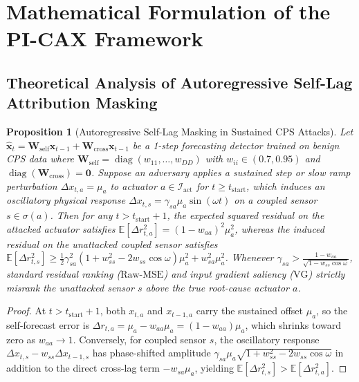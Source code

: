 \documentclass[10pt,a4paper]{article}
\newtheorem{proposition}{Proposition}
\begin{document}
\section{Mathematical Formulation of the PI-CAX Framework}

\subsection{Theoretical Analysis of Autoregressive Self-Lag Attribution Masking}

\begin{proposition}[Autoregressive Self-Lag Masking in Sustained CPS Attacks]\label{prop:masking}
Let $\hat{\mathbf{x}}_t = \mathbf{W}_{\text{self}} \mathbf{x}_{t-1} + \mathbf{W}_{\text{cross}} \mathbf{x}_{t-1}$ be a 1-step forecasting detector trained on benign CPS data where $\mathbf{W}_{\text{self}} = \operatorname{diag}(w_{11}, \dots, w_{DD})$ with $w_{ii} \in (0.7, 0.95)$ and $\operatorname{diag}(\mathbf{W}_{\text{cross}}) = \mathbf{0}$. Suppose an adversary applies a sustained step or slow ramp perturbation $\Delta x_{t,a} = \mu_a$ to actuator $a \in \mathcal{I}_{\text{act}}$ for $t \ge t_{\text{start}}$, which induces an oscillatory physical response $\Delta x_{t,s} = \gamma_{sa} \mu_a \sin(\omega t)$ on a coupled sensor $s \in \sigma(a)$. Then for any $t > t_{\text{start}} + 1$, the expected squared residual on the attacked actuator satisfies $\mathbb{E}[\Delta r_{t,a}^2] = (1 - w_{aa})^2 \mu_a^2$, whereas the induced residual on the unattacked coupled sensor satisfies $\mathbb{E}[\Delta r_{t,s}^2] \ge \frac{1}{2}\gamma_{sa}^2 (1 + w_{ss}^2 - 2 w_{ss}\cos\omega)\mu_a^2 + w_{sa}^2 \mu_a^2$. Whenever $\gamma_{sa} > \frac{1 - w_{aa}}{\sqrt{1 - w_{ss}\cos\omega}}$, standard residual ranking ($\text{Raw-MSE}$) and input gradient saliency ($\text{VG}$) strictly misrank the unattacked sensor $s$ above the true root-cause actuator $a$.
\end{proposition}

\begin{proof}
At $t > t_{\text{start}} + 1$, both $x_{t,a}$ and $x_{t-1,a}$ carry the sustained offset $\mu_a$, so the self-forecast error is $\Delta r_{t,a} = \mu_a - w_{aa}\mu_a = (1 - w_{aa})\mu_a$, which shrinks toward zero as $w_{aa} \to 1$. Conversely, for coupled sensor $s$, the oscillatory response $\Delta x_{t,s} - w_{ss}\Delta x_{t-1,s}$ has phase-shifted amplitude $\gamma_{sa}\mu_a\sqrt{1 + w_{ss}^2 - 2w_{ss}\cos\omega}$ in addition to the direct cross-lag term $-w_{sa}\mu_a$, yielding $\mathbb{E}[\Delta r_{t,s}^2] > \mathbb{E}[\Delta r_{t,a}^2]$.
\end{proof}
\end{document}
